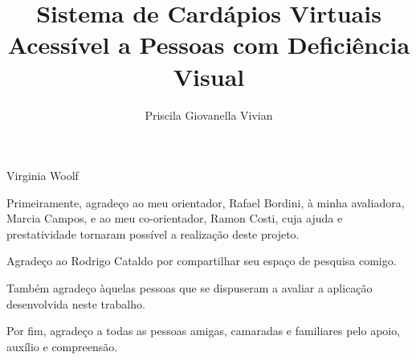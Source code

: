 \documentclass[portuguese,oneside]{tcc}
\author{Priscila Giovanella Vivian}
\title{Sistema de Cardápios Virtuais Acessível a Pessoas com Deficiência Visual}
	{A Virtual Menu System Accessible to Visually Impaired People}
\begin{document}
		
		
		{Virginia Woolf}
		
		
		\begin{agradecimentos}
			
			Primeiramente, agradeço ao meu orientador, Rafael Bordini, à minha avaliadora, Marcia Campos, e ao meu co-orientador, Ramon Costi, cuja ajuda e prestatividade tornaram possível a realização deste projeto.
			
			Agradeço ao Rodrigo Cataldo por compartilhar seu espaço de pesquisa comigo.
			
			Também agradeço àquelas pessoas que se dispuseram a avaliar a aplicação desenvolvida neste trabalho.
			
			Por fim, agradeço a todas as pessoas amigas, camaradas e familiares pelo apoio, auxílio e compreensão.
		\end{agradecimentos}
		
\end{document}
